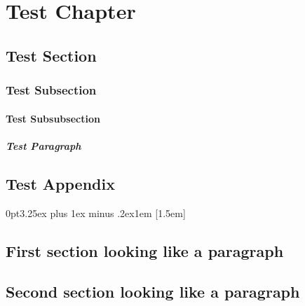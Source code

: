 \documentclass[10pt, a4paper]{report}
\begin{document}
\setcounter{secnumdepth}{3}

\renewcommand*\contentsname{Contents (detailed)}


\cleardoublepage

\setcounter{tocdepth}{4}
\renewcommand*\contentsname{Contents (detailed)}
\tableofcontents

\chapter{Test Chapter}
\section{Test Section}
\subsection{Test Subsection}
\subsubsection{Test Subsubsection}
\paragraph{Test Paragraph}

\begin{appendices}

\renewcommand\thechapter{}

\chapter{Test Appendix}

\titleformat{\section}[runin]
  {\normalfont\normalsize\bfseries}{}{1em}{}
\titlespacing*{\section}
  {0pt}{3.25ex plus 1ex minus .2ex}{1em}
[1.5em]
  {}{}{}{\contentspage}

\section{First section looking like a paragraph}
\section{Second section looking like a paragraph}

\end{appendices}
\end{document}

